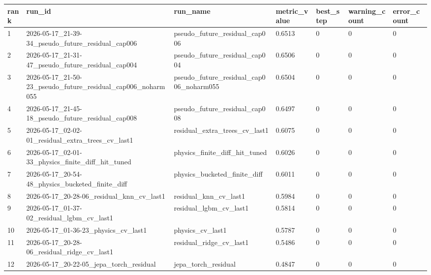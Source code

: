 \begin{tabular}{lllllll}
rank & run\_id & run\_name & metric\_value & best\_step & warning\_count & error\_count \\
\hline
1 & 2026-05-17\_21-39-34\_pseudo\_future\_residual\_cap006 & pseudo\_future\_residual\_cap006 & 0.6513 & 0 & 0 & 0 \\
2 & 2026-05-17\_21-31-47\_pseudo\_future\_residual\_cap004 & pseudo\_future\_residual\_cap004 & 0.6506 & 0 & 0 & 0 \\
3 & 2026-05-17\_21-50-23\_pseudo\_future\_residual\_cap006\_noharm055 & pseudo\_future\_residual\_cap006\_noharm055 & 0.6504 & 0 & 0 & 0 \\
4 & 2026-05-17\_21-45-18\_pseudo\_future\_residual\_cap008 & pseudo\_future\_residual\_cap008 & 0.6497 & 0 & 0 & 0 \\
5 & 2026-05-17\_02-02-01\_residual\_extra\_trees\_cv\_last1 & residual\_extra\_trees\_cv\_last1 & 0.6075 & 0 & 0 & 0 \\
6 & 2026-05-17\_02-01-33\_physics\_finite\_diff\_hit\_tuned & physics\_finite\_diff\_hit\_tuned & 0.6026 & 0 & 0 & 0 \\
7 & 2026-05-17\_20-54-48\_physics\_bucketed\_finite\_diff & physics\_bucketed\_finite\_diff & 0.6011 & 0 & 0 & 0 \\
8 & 2026-05-17\_20-28-06\_residual\_knn\_cv\_last1 & residual\_knn\_cv\_last1 & 0.5984 & 0 & 0 & 0 \\
9 & 2026-05-17\_01-37-02\_residual\_lgbm\_cv\_last1 & residual\_lgbm\_cv\_last1 & 0.5814 & 0 & 0 & 0 \\
10 & 2026-05-17\_01-36-23\_physics\_cv\_last1 & physics\_cv\_last1 & 0.5787 & 0 & 0 & 0 \\
11 & 2026-05-17\_20-28-06\_residual\_ridge\_cv\_last1 & residual\_ridge\_cv\_last1 & 0.5486 & 0 & 0 & 0 \\
12 & 2026-05-17\_20-22-05\_jepa\_torch\_residual & jepa\_torch\_residual & 0.4847 & 0 & 0 & 0 \\
\end{tabular}
